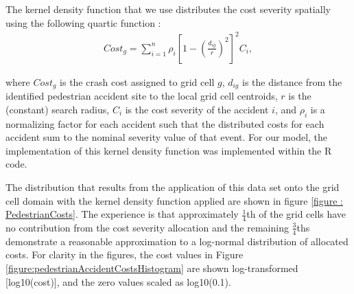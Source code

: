 \documentclass{llncs}
\begin{document}
The kernel density function that we use distributes the cost severity spatially using the following quartic function\cite{xie2017analysis} : 
\begin{align}
Cost_{g} = \sum_{i=1}^{n} \rho_{i} \left [ 1 - \left ( \frac{d_{ig}}{r} \right )^{2} \right ]^{2}C_{i},
\end{align}

where $Cost_{g}$ is the crash cost assigned to grid cell $g$, $d_{ig}$    is the distance from the identified pedestrian accident site to the local grid cell centroids, $r$ is the (constant) search radius, $C_{i}$ is the cost severity of the accident ${i}$, and $\rho_{i}$ is a normalizing factor for each accident such that the distributed costs for each accident sum to the nominal severity value of that event. For our model, the implementation of this kernel density function was implemented within the R code.

The distribution that results from the application of this data set onto the grid cell domain with the kernel density function applied are shown in figure \ref{figure : PedestrianCosts}. The experience is that approximately $\frac{1}{4}$th of the grid cells have no contribution from the cost severity allocation and the remaining $\frac{3}{4}$ths demonstrate a reasonable approximation to a log-normal distribution of allocated costs. For clarity in the figures, the cost values in Figure  \ref{figure:pedestrianAccidentCostsHistogram} are shown log-transformed [log10(cost)], and the zero values scaled as log10(0.1).


\end{document}
